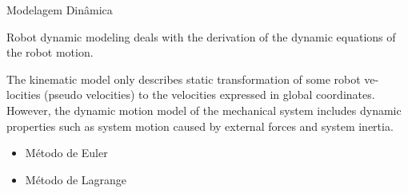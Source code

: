 \documentclass{beamer}
\begin{document}
\begin{frame}{Modelagem Dinâmica}

    Robot dynamic modeling deals with the derivation of the dynamic equations of the robot motion.

    \begin{block}{}
        The kinematic model only describes static transformation of some robot ve-
        locities (pseudo velocities) to the velocities expressed in global coordinates.
        However, the dynamic motion model of the mechanical system includes
        dynamic properties such as system motion caused by external forces and
        system inertia.
    \end{block}

    \begin{itemize}
        \item Método de Euler
        \item Método de Lagrange
    \end{itemize}
\end{frame}
\end{document}
